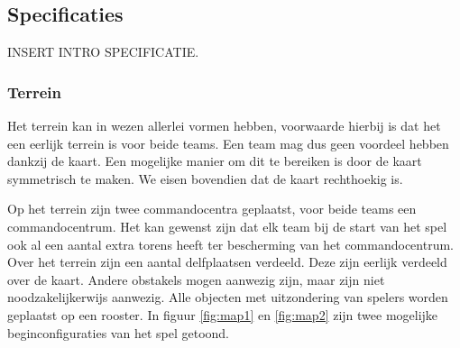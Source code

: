 \documentclass[a4paper,11pt, twoside]{article}
\begin{document}
    \subsection{Specificaties}
    INSERT INTRO SPECIFICATIE.

	\subsubsection{Terrein}
    Het terrein kan in wezen allerlei vormen hebben, voorwaarde hierbij is dat het een eerlijk terrein is voor beide teams. Een team mag dus geen voordeel hebben dankzij de kaart. Een mogelijke manier om dit te bereiken is door de kaart symmetrisch te maken. We eisen bovendien dat de kaart rechthoekig is.

    Op het terrein zijn twee commandocentra geplaatst, voor beide teams een commandocentrum. Het kan gewenst zijn dat elk team bij de start van het spel ook al een aantal extra torens heeft ter bescherming van het commandocentrum. Over het terrein zijn een aantal delfplaatsen verdeeld. Deze zijn eerlijk verdeeld over de kaart. Andere obstakels mogen aanwezig zijn, maar zijn niet noodzakelijkerwijs aanwezig. Alle objecten met uitzondering van spelers worden geplaatst op een rooster. In figuur \ref{fig:map1} en \ref{fig:map2} zijn twee mogelijke beginconfiguraties van het spel getoond.
    
\end{document}
